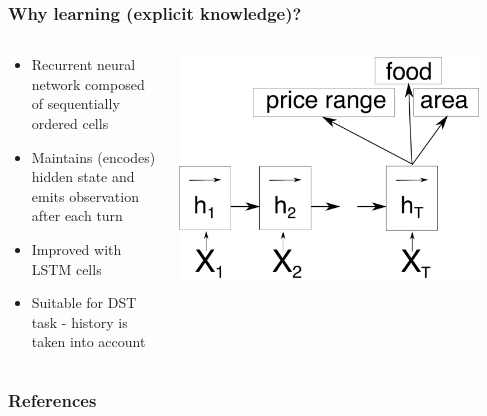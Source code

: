 \documentclass[10pt, compress,british,xcolor={svgnames,dvipsnames,x11names},trans]{beamer}
\begin{document}
\begin{frame}
    \frametitle{Why learning (explicit knowledge)?}
    \begin{columns}
        \begin{column}{0.65\textwidth}
            \begin{itemize}
                \item Recurrent neural network composed of sequentially ordered cells
                \item Maintains (encodes) hidden state and emits observation after each turn
                \item Improved with LSTM cells
                \item Suitable for DST task - history is taken into account
            \end{itemize}
        \end{column}
        \begin{column}{0.35\textwidth}
            \includegraphics[width=0.90\textwidth]{encoder.pdf}
        \end{column}
    \end{columns}
\end{frame}


\appendix

\begin{frame}[allowframebreaks]
        \frametitle{References}
        
        
\end{frame}
\end{document}
